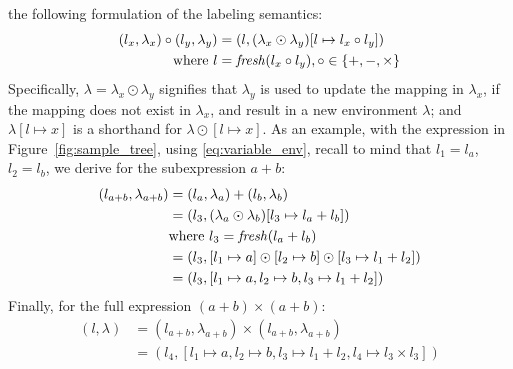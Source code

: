 the following formulation of the labeling semantics:
\begin{equation}
    \begin{aligned}
        (l_x, \lambda_x) \circ (l_y, \lambda_y)
            &= (l, (\lambda_x\odot\lambda_y)
                      [l\mapsto{l_x \circ l_y}]) \\
            \text{where~} l &= \operatorname{\mathit{fresh}}(l_x \circ l_y),
                          \circ\in\{+, -, \times\}
    \end{aligned}
    \label{eq:labeling_semantics}
\end{equation}
Specifically, $\lambda=\lambda_x\odot\lambda_y$ signifies that $\lambda_y$
is used to update the mapping in $\lambda_x$, if the mapping does not
exist in $\lambda_x$, and result in a new environment $\lambda$; and
$\lambda[l\mapsto{x}]$ is a shorthand for $\lambda\odot[l\mapsto{x}]$.
As an example, with the expression in Figure~\ref{fig:sample_tree}, using
\eqref{eq:variable_env}, recall to mind that $l_1 = l_a$, $l_2 = l_b$, we
derive for the subexpression $a + b$:
\begin{equation}
    \begin{aligned}
        (l_{a + b}, \lambda_{a + b})
            &= (l_a, \lambda_a) + (l_b, \lambda_b) \\
            &= (l_3, (\lambda_a \odot \lambda_b) [l_3\mapsto{l_a + l_b}]) \\
            &  \text{where~} l_3 = \operatorname{\mathit{fresh}}(l_a + l_b) \\
            &= (l_3, [l_1\mapsto{a}]\odot
                     [l_2\mapsto{b}]\odot
                     [l_3\mapsto{l_1 + l_2}]) \\
            &= (l_3, [l_1\mapsto{a}, l_2\mapsto{b}, l_3\mapsto{l_1 + l_2}])
    \end{aligned}
\end{equation}
Finally, for the full expression $(a + b) \times (a + b)$:
\begin{equation}
    \begin{aligned}
        (l, \lambda)
            &= (l_{a + b}, \lambda_{a + b}) \times
               (l_{a + b}, \lambda_{a + b}) \\
            &= (l_4, [l_1\mapsto{a}, l_2\mapsto{b},
                      l_3\mapsto{l_1 + l_2}, l_4\mapsto{l_3 \times l_3}])
    \end{aligned}
\end{equation}

